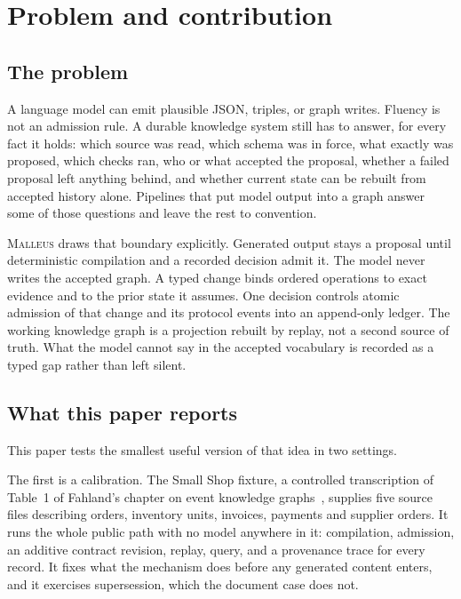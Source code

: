 \documentclass[10pt]{article}
\newcommand{\malleus}{\textsc{Malleus}}
\begin{document}
\section{Problem and contribution}

\subsection{The problem}

A language model can emit plausible JSON, triples, or graph writes. Fluency is not an admission rule. A durable knowledge system still has to answer, for every fact it holds: which source was read, which schema was in force, what exactly was proposed, which checks ran, who or what accepted the proposal, whether a failed proposal left anything behind, and whether current state can be rebuilt from accepted history alone. Pipelines that put model output into a graph answer some of those questions and leave the rest to convention.

\malleus{} draws that boundary explicitly. Generated output stays a proposal until deterministic compilation and a recorded decision admit it. The model never writes the accepted graph. A typed change binds ordered operations to exact evidence and to the prior state it assumes. One decision controls atomic admission of that change and its protocol events into an append-only ledger. The working knowledge graph is a projection rebuilt by replay, not a second source of truth. What the model cannot say in the accepted vocabulary is recorded as a typed gap rather than left silent.

\subsection{What this paper reports}

This paper tests the smallest useful version of that idea in two settings.

The first is a calibration. The Small Shop fixture, a controlled transcription of Table~1 of Fahland's chapter on event knowledge graphs~\citep{fahland2022ekg}, supplies five source files describing orders, inventory units, invoices, payments and supplier orders. It runs the whole public path with no model anywhere in it: compilation, admission, an additive contract revision, replay, query, and a provenance trace for every record. It fixes what the mechanism does before any generated content enters, and it exercises supersession, which the document case does not.
\end{document}
